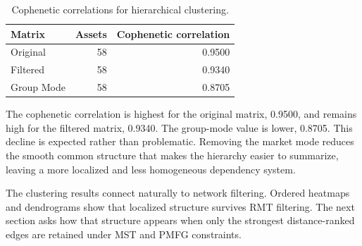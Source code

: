 \begin{table}
\centering
\caption{Cophenetic correlations for hierarchical clustering.}
\label{tab:cophenetic_summary}
\begin{tabular}{lrr}
\toprule
Matrix & Assets & Cophenetic correlation \\
\midrule
Original & 58 & 0.9500 \\
Filtered & 58 & 0.9340 \\
Group Mode & 58 & 0.8705 \\
\bottomrule
\end{tabular}
\end{table}
\FloatBarrier

The cophenetic correlation is highest for the original matrix, 0.9500, and remains high for the filtered matrix, 0.9340. The group-mode value is lower, 0.8705. This decline is expected rather than problematic. Removing the market mode reduces the smooth common structure that makes the hierarchy easier to summarize, leaving a more localized and less homogeneous dependency system.

The clustering results connect naturally to network filtering. Ordered heatmaps and dendrograms show that localized structure survives RMT filtering. The next section asks how that structure appears when only the strongest distance-ranked edges are retained under MST and PMFG constraints.
